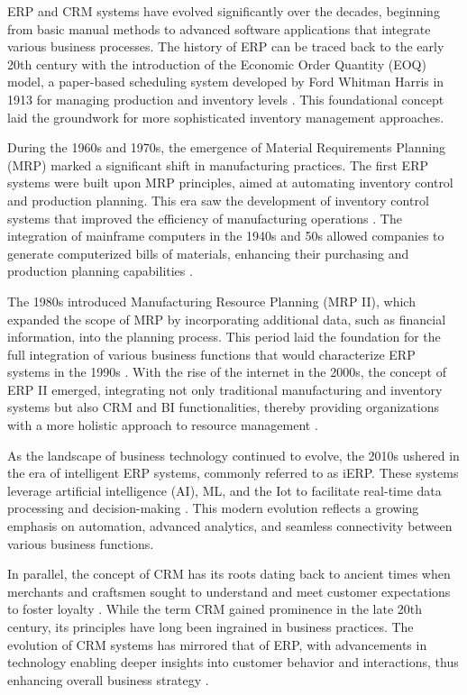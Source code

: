 ERP and CRM systems have evolved significantly over the decades, beginning from basic manual methods to advanced software applications that integrate various business processes. The history of ERP can be traced back to the early 20th century with the introduction of the Economic Order Quantity (EOQ) model, a paper-based scheduling system developed by Ford Whitman Harris in 1913 for managing production and inventory levels \cite{software_connect_erp, history_erp_mrp}. This foundational concept laid the groundwork for more sophisticated inventory management approaches.

During the 1960s and 1970s, the emergence of Material Requirements Planning (MRP) marked a significant shift in manufacturing practices. The first ERP systems were built upon MRP principles, aimed at automating inventory control and production planning. This era saw the development of inventory control systems that improved the efficiency of manufacturing operations \cite{appmaster_erp, software_connect_erp}. The integration of mainframe computers in the 1940s and 50s allowed companies to generate computerized bills of materials, enhancing their purchasing and production planning capabilities \cite{sap_evolution, software_suggest_erp}.

The 1980s introduced Manufacturing Resource Planning (MRP II), which expanded the scope of MRP by incorporating additional data, such as financial information, into the planning process. This period laid the foundation for the full integration of various business functions that would characterize ERP systems in the 1990s \cite{sap_tm, software_connect_erp}. With the rise of the internet in the 2000s, the concept of ERP II emerged, integrating not only traditional manufacturing and inventory systems but also CRM and BI  functionalities, thereby providing organizations with a more holistic approach to resource management \cite{oracle_erp, software_connect_erp}.

As the landscape of business technology continued to evolve, the 2010s ushered in the era of intelligent ERP systems, commonly referred to as iERP. These systems leverage artificial intelligence (AI), ML, and the Iot to facilitate real-time data processing and decision-making \cite{sap_features, appmaster_erp}. This modern evolution reflects a growing emphasis on automation, advanced analytics, and seamless connectivity between various business functions.

In parallel, the concept of CRM has its roots dating back to ancient times when merchants and craftsmen sought to understand and meet customer expectations to foster loyalty \cite{appvizer_crm, forbes_crm}. While the term CRM gained prominence in the late 20th century, its principles have long been ingrained in business practices. The evolution of CRM systems has mirrored that of ERP, with advancements in technology enabling deeper insights into customer behavior and interactions, thus enhancing overall business strategy \cite{forbes_crm, medium_crm}.

